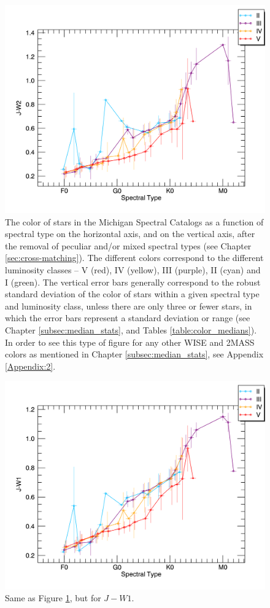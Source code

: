 \begin{figure}[t]
\centering
\includegraphics[width=1.0\textwidth,clip=true]{Figures/subtype_bar/SPT_J-W2.png}
\caption{The color of stars in the Michigan Spectral Catalogs as a function of spectral type on the horizontal axis, and \jwtwo on the vertical axis, after the removal of peculiar and/or mixed spectral types (see Chapter \ref{sec:cross-matching}). The different colors correspond to the different luminosity classes -- V (red), IV (yellow), III (purple), II (cyan) and I (green).  The vertical error bars generally correspond to the robust standard deviation of the \jwtwo color of stars within a given spectral type and luminosity class, unless there are only three or fewer stars, in which the error bars represent a standard deviation or range (see Chapter \ref{subsec:median_stats}, and Tables \ref{table:color_medians}). In order to see this type of figure for any other WISE and 2MASS colors as mentioned in Chapter \ref{subsec:median_stats}, see Appendix \ref{Appendix:2}.} \label{fig:median_stick_bar_jw2}
\end{figure}

\begin{figure}[t]
\centering
\includegraphics[width=1.0\textwidth,clip=true]{Figures/subtype_bar/SPT_J-W1.png}
\caption{Same as Figure \ref{fig:median_stick_bar_jw2}, but for $J-W{1}$.} \label{fig:median_stick_bar_jw1}
\end{figure}